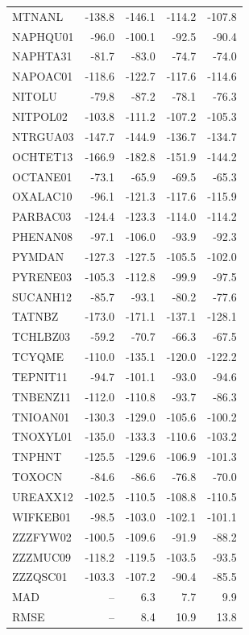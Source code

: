 \begin{longtable}{lrrrr}
MTNANL & -138.8 & -146.1 & -114.2 & -107.8 \\
NAPHQU01 & -96.0 & -100.1 & -92.5 & -90.4 \\
NAPHTA31 & -81.7 & -83.0 & -74.7 & -74.0 \\
NAPOAC01 & -118.6 & -122.7 & -117.6 & -114.6 \\
NITOLU & -79.8 & -87.2 & -78.1 & -76.3 \\
NITPOL02 & -103.8 & -111.2 & -107.2 & -105.3 \\
NTRGUA03 & -147.7 & -144.9 & -136.7 & -134.7 \\
OCHTET13 & -166.9 & -182.8 & -151.9 & -144.2 \\
OCTANE01 & -73.1 & -65.9 & -69.5 & -65.3 \\
OXALAC10 & -96.1 & -121.3 & -117.6 & -115.9 \\
PARBAC03 & -124.4 & -123.3 & -114.0 & -114.2 \\
PHENAN08 & -97.1 & -106.0 & -93.9 & -92.3 \\
PYMDAN & -127.3 & -127.5 & -105.5 & -102.0 \\
PYRENE03 & -105.3 & -112.8 & -99.9 & -97.5 \\
SUCANH12 & -85.7 & -93.1 & -80.2 & -77.6 \\
TATNBZ & -173.0 & -171.1 & -137.1 & -128.1 \\
TCHLBZ03 & -59.2 & -70.7 & -66.3 & -67.5 \\
TCYQME & -110.0 & -135.1 & -120.0 & -122.2 \\
TEPNIT11 & -94.7 & -101.1 & -93.0 & -94.6 \\
TNBENZ11 & -112.0 & -110.8 & -93.7 & -86.3 \\
TNIOAN01 & -130.3 & -129.0 & -105.6 & -100.2 \\
TNOXYL01 & -135.0 & -133.3 & -110.6 & -103.2 \\
TNPHNT & -125.5 & -129.6 & -106.9 & -101.3 \\
TOXOCN & -84.6 & -86.6 & -76.8 & -70.0 \\
UREAXX12 & -102.5 & -110.5 & -108.8 & -110.5 \\
WIFKEB01 & -98.5 & -103.0 & -102.1 & -101.1 \\
ZZZFYW02 & -100.5 & -109.6 & -91.9 & -88.2 \\
ZZZMUC09 & -118.2 & -119.5 & -103.5 & -93.5 \\
ZZZQSC01 & -103.3 & -107.2 & -90.4 & -85.5 \\
MAD & -- & 6.3 & 7.7 & 9.9 \\
RMSE & -- & 8.4 & 10.9 & 13.8 \\
\end{longtable}